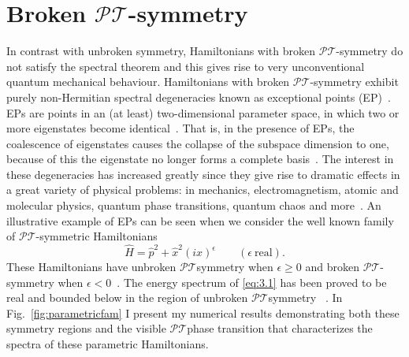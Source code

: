 \documentclass[12pt, a4paper]{report}
\newcommand\PT{\(\mathcal{PT}\)}
\begin{document}
\chapter{Broken \PT-symmetry}\label{EPs}
In contrast with unbroken symmetry, Hamiltonians with broken \PT-symmetry do not satisfy the spectral theorem and this gives rise to very unconventional quantum mechanical behaviour. Hamiltonians with broken \PT-symmetry exhibit purely non-Hermitian spectral degeneracies known as exceptional points (EP)~\cite{Bossart}.
EPs are points in an (at least) two-dimensional parameter space, in which two or more eigenstates become identical~\cite{Moiseyev, Cartarius}. That is, in the presence of EPs, the coalescence of eigenstates causes the collapse of the subspace dimension to one, because of this the eigenstate no longer forms a complete basis~\cite{Bagarello}. The interest in these degeneracies has increased greatly since they give rise to dramatic effects in a great variety of physical problems: in mechanics, electromagnetism, atomic and molecular physics, quantum phase transitions, quantum chaos and more~\cite{Heiss_2012}.
An illustrative example of EPs can be seen when we consider the well known family of \PT-symmetric Hamiltonians
\begin{equation}\label{eq:3.1}
\hat{H} = \hat{p}^2 + \hat{x}^{2}(i x)^{\epsilon} \quad\quad (\epsilon\:\mathrm{real}). 
\end{equation}
These Hamiltonians have unbroken \PT\:symmetry when $\epsilon \geq 0$ and broken \PT-symmetry when $\epsilon < 0$~\cite{MakingSense}. The energy spectrum of \ref{eq:3.1} has been proved to be real and bounded below in the region of unbroken \PT\:symmetry ~\cite{Dorey_2004}. In Fig.~\ref{fig:parametricfam} I present my numerical results demonstrating both these symmetry regions and the visible \PT\:phase transition that characterizes the spectra of these parametric Hamiltonians.
\end{document}
